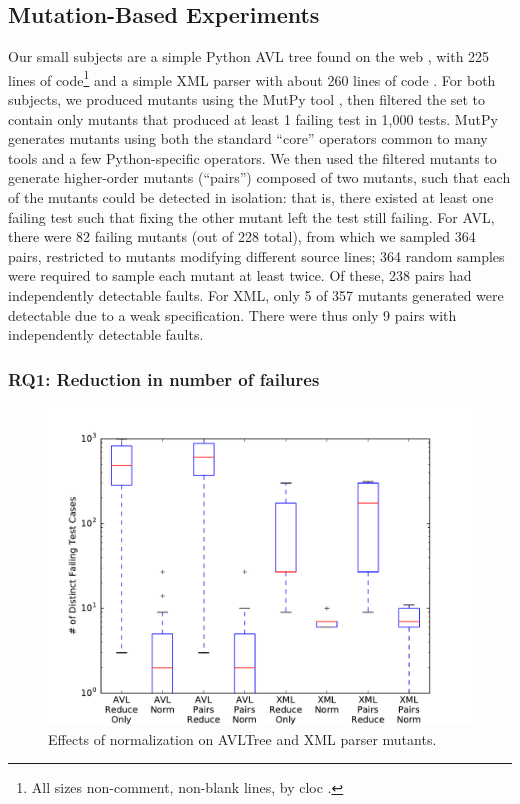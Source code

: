 \subsection{Mutation-Based Experiments}


Our small subjects are a
simple Python AVL tree found on the web
\cite{avltree}, with 225 lines of code\footnote{All sizes non-comment,
  non-blank lines, by cloc \cite{cloc}.} and a
simple XML parser with about 260 lines of code \cite{myxml}.  For both
subjects, we produced mutants using the MutPy tool
\cite{mutpy}, then filtered the set to contain only mutants that produced
at least 1 failing test in 1,000 tests.  MutPy generates mutants using
both the standard ``core'' operators common to many tools \cite{mutant} and
a few Python-specific operators.  We then used the filtered
mutants to generate higher-order mutants (``pairs'') composed of two mutants,
such that each of the mutants could be detected in isolation:  that
is, there existed at least one failing test such that fixing the other
mutant left the test still failing.  For AVL, there were 82 failing
mutants (out of 228 total), from which we sampled 364 pairs, restricted to mutants modifying different source lines; 364 random samples
were required to sample each mutant at least twice.  Of these,
238 pairs had independently detectable faults.  For XML, only 5 of 357
mutants generated were detectable due to a weak specification.  There
were thus only 9 pairs with independently
detectable faults.

\subsubsection{RQ1: Reduction in number of failures}

\begin{figure}
\includegraphics[width=\columnwidth]{length}
\caption{Effects of normalization on AVLTree and XML parser mutants.}
\label{normeffect}
\end{figure}

